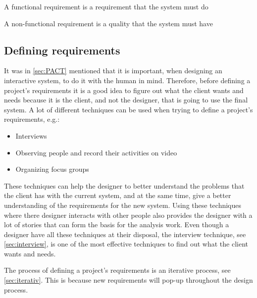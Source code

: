 \begin{defn}
A functional requirement is a requirement that the system must do
\end{defn}

\begin{defn}
A non-functional requirement is a quality that the system must have
\end{defn}

\subsection{Defining requirements} \label{sec:requirementsdefinition}
It was in \cref{sec:PACT} mentioned that it is important, when designing an interactive system, to do it with the human in mind.
Therefore, before defining a project's requirements it is a good idea to figure out what the client wants and needs because it is the client, and not the designer, that is going to use the final system.
A lot of different techniques can be used when trying to define a project's requirements, e.g.:

\begin{itemize}
        \item Interviews
        \item Observing people and record their activities on video
        \item Organizing focus groups
\end{itemize}

These techniques can help the designer to better understand the problems that the client has with the current system, and at the same time, give a better understanding of the requirements for the new system.
Using these techniques where there designer interacts with other people also provides the designer with a lot of stories that can form the basis for the analysis work. Even though a designer have all these techniques at their disposal, the interview technique, see \cref{sec:interview}, is one of the most effective techniques to find out what the client wants and needs.

The process of defining a project's requirements is an iterative process, see \cref{sec:iterativ}. This is because new requirements will pop-up throughout the design process.


